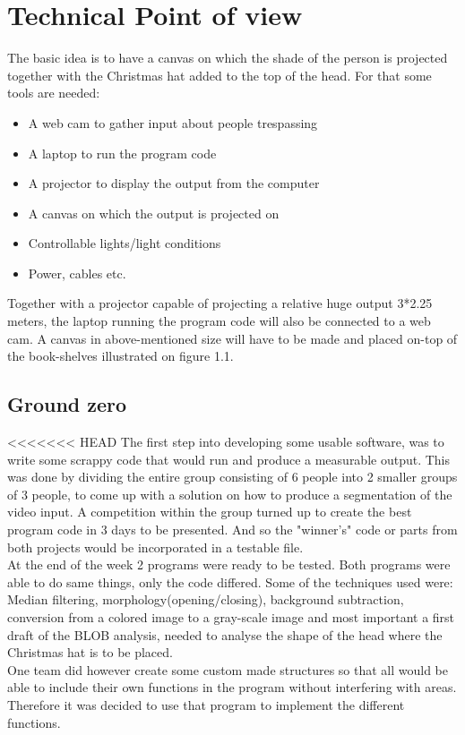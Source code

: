 \section{Technical Point of view}
The basic idea is to have a canvas on which the shade of the person is projected together with the Christmas hat added to the top of the head. For that some tools are needed:

\begin{itemize}
\item A web cam to gather input about people trespassing
\item A laptop to run the program code
\item A projector to display the output from the computer
\item A canvas on which the output is projected on
\item Controllable lights/light conditions
\item Power, cables etc.
\end{itemize}

Together with a projector capable of projecting a relative huge output 3*2.25 meters, the laptop running the program code will also be connected to a web cam. A canvas in above-mentioned size will have to be made and placed on-top of the book-shelves illustrated on figure 1.1. 

\subsection{Ground zero}
<<<<<<< HEAD
The first step into developing some usable software, was to write some scrappy code that would run and produce a measurable output. This was done by dividing the entire group consisting of 6 people into 2 smaller groups of 3 people, to come up with a solution on how to produce a segmentation of the video input. A competition within the group turned up to create the best program code in 3 days to be presented. And so the "winner's" code or parts from both projects would be incorporated in a testable file.\\
At the end of the week 2 programs were ready to be tested. Both programs were able to do same things, only the code differed. Some of the techniques used were: Median filtering, morphology(opening/closing), background subtraction, conversion from a colored image to a gray-scale image and most important a first draft of the BLOB analysis, needed to analyse the shape of the head where the Christmas hat is to be placed.\\
One team did however create some custom made structures so that all would be able to include their own functions in the program without interfering with areas. Therefore it was decided to use that program to implement the different functions.

